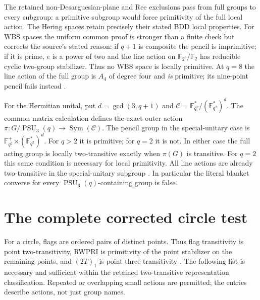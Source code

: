 \documentclass[11pt,a4paper]{article}
\newcommand{\F}{\mathbb F}
\begin{document}
The retained non-Desarguesian-plane and Ree exclusions pass from full
groups to every subgroup: a primitive subgroup would force primitivity
of the full local action. The Hering spaces retain precisely their
stated BDD local properties. For WBS spaces the uniform common proof
is stronger than a finite check but corrects the source's stated reason:
if $q+1$ is composite the pencil is imprimitive; if it is prime,
$e$ is a power of two and the line action on $\F_{2^e}/\F_2$
has reducible cyclic two-group stabilizer. Thus no WBS space is
locally primitive. At $q=8$ the line action of the full group is
$A_4$ of degree four and \emph{is} primitive; its nine-point pencil
fails instead \cite[Propositions~\ref{U-wbs-model}--\ref{U-wbs-exclusion}]{U}.

For the Hermitian unital, put $d=\gcd(3,q+1)$ and
$\mathcal C=\F_{q^2}^*/(\F_{q^2}^*)^d$. The common matrix
calculation defines the exact outer action
$\pi:G/\operatorname{PSU}_3(q)\to\operatorname{Sym}(\mathcal C)$.
The pencil group in the special-unitary case is
$\F_{q^2}^+\rtimes(\F_{q^2}^*)^d$. For $q>2$ it is primitive;
for $q=2$ it is not. In either case the full acting group is locally
two-transitive exactly when $\pi(G)$ is transitive. For $q=2$ this
same condition is necessary for local primitivity. All line actions
are already two-transitive in the special-unitary subgroup
\cite[Theorem~\ref{U-unitary}]{U}. In particular the literal blanket
converse for every $\operatorname{PSU}_3(q)$-containing group is false.

\section{The complete corrected circle test}\label{circles}
For a circle, flags are ordered pairs of distinct points. Thus flag
transitivity is point two-transitivity, RWPRI is primitivity of the
point stabilizer on the remaining points, and $(2T)_1$ is point
three-transitivity \cite[Proposition~\ref{U-circles}]{U}. The following
list is necessary and sufficient within the retained two-transitive
representation classification. Repeated or overlapping small actions
are permitted; the entries describe actions, not just group names.
\end{document}
